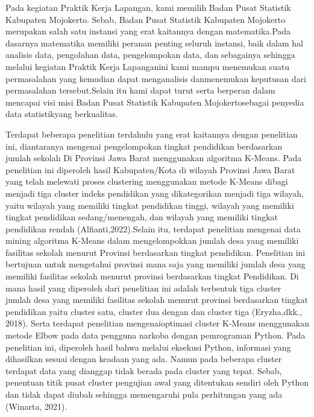 Pada kegiatan Praktik Kerja Lapangan, kami memilih Badan Pusat Statistik Kabupaten Mojokerto. Sebab, Badan Pusat Statistik Kabupaten Mojokerto merupakan salah satu instansi yang erat kaitannya dengan matematika.Pada dasarnya matematika memiliki peranan penting seluruh instansi, baik dalam hal analisis data, pengolahan data, pengelompokan data, dan sebagainya sehingga melalui kegiatan Praktik  Kerja  Lapanganini  kami  mampu menemukan suatu permasalahan yang kemudian dapat menganalisis danmenemukan keputusan dari permasalahan tersebut.Selain itu kami dapat turut serta berperan dalam mencapai visi misi Badan Pusat Statistik Kabupaten Mojokertosebagai penyedia data statistikyang berkualitas. 

Terdapat  beberapa  penelitian  terdahulu  yang  erat  kaitannya  dengan penelitian  ini,  diantaranya  mengenai pengelompokan  tingkat  pendidikan berdasarkan jumlah sekolah Di Provinsi Jawa Barat menggunakan algoritma K-Means. Pada penelitian ini diperoleh hasil Kabupaten/Kota di wilayah Provinsi Jawa Barat yang telah melewati proses clustering menggunakan metode  K-Means  dibagi  menjadi  tiga  cluster  indeks  pendidikan  yang dikategorikan menjadi tiga wilayah, yaitu wilayah yang memiliki tingkat pendidikan tinggi, wilayah yang memiliki tingkat pendidikan sedang/menengah, dan wilayah yang memiliki tingkat pendidikan rendah (Alfianti,2022).Selain itu, terdapat penelitian mengenai data mining algoritma K-Means dalam mengelompokkan jumlah desa yang memiliki fasilitas sekolah menurut Provinsi berdasarkan tingkat pendidikan. Penelitian ini bertujuan untuk mengetahui provinsi mana saja yang memiliki jumlah desa yang memiliki fasilitas sekolah menurut provinsi berdasarkan tingkat Pendidikan. Di mana hasil yang diperoleh dari penelitian ini adalah terbentuk tiga cluster jumlah desa yang memiliki fasilitas sekolah menurut provinsi berdasarkan tingkat pendidikan yaitu cluster satu, cluster dua dengan dan cluster tiga (Eryzha,dkk., 2018). Serta terdapat penelitian mengenaioptimasi cluster K-Means menggunakan metode Elbow pada data pengguna narkoba dengan pemrograman Python. Pada penelitian ini, diperoleh hasil bahwa melalui eksekusi Python, informasi yang dihasilkan sesuai dengan keadaan yang ada. Namun pada beberapa cluster terdapat data yang dianggap tidak berada pada cluster yang tepat. Sebab, penentuan titik pusat cluster pengujian awal yang ditentukan sendiri oleh Python dan tidak dapat diubah sehingga memengaruhi pula perhitungan yang ada (Winarta, 2021).

